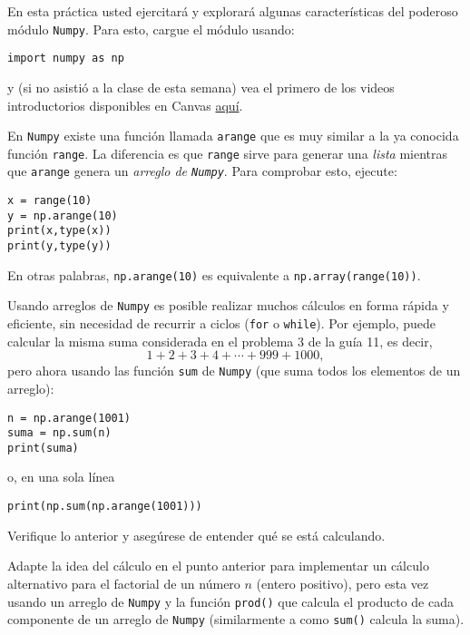 \documentclass[11pt]{exam}
\begin{document}
\begin{questions}
\item En esta práctica usted ejercitará y explorará algunas características del poderoso módulo \texttt{Numpy}. Para esto, cargue el módulo usando:

\begin{verbatim}
import numpy as np
\end{verbatim}

y (si no asistió a la clase de esta semana) vea el primero de los videos introductorios disponibles en Canvas \href{https://udec.instructure.com/courses/51022/pages/numpy}{aquí}.

\item En \texttt{Numpy} existe una función llamada \texttt{arange} que es muy similar a la ya conocida función \texttt{range}. La diferencia es que \texttt{range} sirve para generar una \textit{lista} mientras que \texttt{arange} genera un \textit{arreglo de \texttt{Numpy}}. Para comprobar esto, ejecute:

\begin{verbatim}
x = range(10)
y = np.arange(10)
print(x,type(x))
print(y,type(y))
\end{verbatim}

En otras palabras, \texttt{np.arange(10)} es equivalente a \texttt{np.array(range(10))}.

\item Usando arreglos de \texttt{Numpy} es posible realizar muchos cálculos en forma rápida y eficiente, sin necesidad de recurrir a ciclos (\texttt{for} o \texttt{while}). Por ejemplo, puede calcular la misma suma considerada en el problema 3 de la guía 11, es decir, 
\begin{equation}
1 + 2 + 3 + 4  + \cdots + 999 + 1000,
\end{equation}
pero ahora usando las función \texttt{sum} de \texttt{Numpy} (que suma todos los elementos de un arreglo):

\begin{verbatim}
n = np.arange(1001)
suma = np.sum(n)
print(suma)
\end{verbatim}
o, en una sola línea

\begin{verbatim}
print(np.sum(np.arange(1001)))
\end{verbatim}
Verifique lo anterior y asegúrese de entender qué se está calculando.

\item Adapte la idea del cálculo en el punto anterior para implementar un cálculo alternativo para el factorial de un número $n$ (entero positivo), pero esta vez usando un arreglo de \texttt{Numpy} y la función \texttt{prod()} que calcula el producto de cada componente de un arreglo de \texttt{Numpy} (similarmente a como \texttt{sum()} calcula la suma).


\end{questions}
\end{document}
